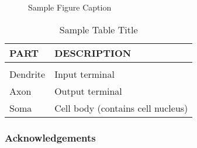 \documentclass[twoside]{article}
\theoremstyle{definition}
\begin{document}
\begin{figure}[h]
\vspace{.3in}
\centerline{}
\vspace{.3in}
\caption{Sample Figure Caption}
\end{figure}


\begin{table}[h]
\caption{Sample Table Title} \label{sample-table}
\begin{center}
\begin{tabular}{ll}
{\bf PART}  &{\bf DESCRIPTION} \\
\hline \\
Dendrite         &Input terminal \\
Axon             &Output terminal \\
Soma             &Cell body (contains cell nucleus) \\
\end{tabular}
\end{center}
\end{table}
\fi

\subsubsection*{Acknowledgements}





\newpage

\end{document}
